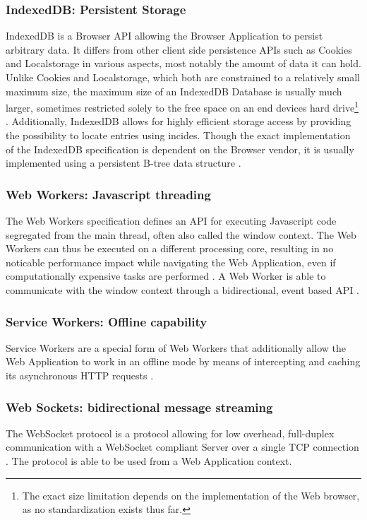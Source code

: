 \subsubsection{IndexedDB: Persistent Storage}
IndexedDB is a Browser API allowing the Browser Application to persist arbitrary data. It differs from other client side persistence APIs such as Cookies and Localstorage in various aspects, most notably the amount of data it can hold. Unlike Cookies and Localstorage, which both are constrained to a relatively small maximum size, the maximum size of an IndexedDB Database is usually much larger, sometimes restricted solely to the free space on an end devices hard drive\footnote{The exact size limitation depends on the implementation of the Web browser, as no standardization exists thus far.} \cite{MDNIndexedDB}. Additionally, IndexedDB allows for highly efficient storage access by providing the possibility to locate entries using incides. Though the exact implementation of the IndexedDB specification is dependent on the Browser vendor, it is usually implemented using a persistent B-tree data structure \cite[sec. 1]{IndexedDBSpec}.
\subsubsection{Web Workers: Javascript threading}
The Web Workers specification defines an API for executing Javascript code segregated from the main thread, often also called the window context. The Web Workers can thus be executed on a different processing core, resulting in no noticable performance impact while navigating the Web Application, even if computationally expensive tasks are performed \cite[sec. 1.2.1]{workerdraft}. A Web Worker is able to communicate with the window context through a bidirectional, event based API \cite[sec. 4.6.1]{workerdraft}.
\subsubsection{Service Workers: Offline capability}
Service Workers are a special form of Web Workers that additionally allow the Web Application to work in an offline mode by means of intercepting and caching its asynchronous HTTP requests \cite[sec 4.5, 5]{serviceworkersdraft}.
\subsubsection{Web Sockets: bidirectional message streaming}
The WebSocket protocol is a protocol allowing for low overhead, full-duplex communication with a WebSocket compliant Server over a single TCP connection \cite[sec. 1.1]{rfc6455}. The protocol is able to be used from a Web Application context.
\label{sec:tech-web-sockets}
